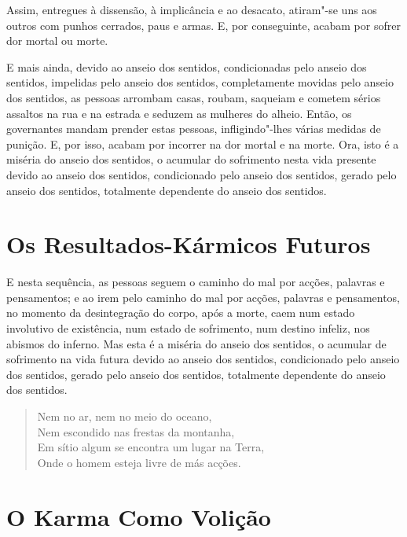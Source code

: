 Assim, entregues à dissensão, à implicância e ao desacato, atiram"-se uns aos
outros com punhos cerrados, paus e armas. E, por conseguinte, acabam por sofrer
dor mortal ou morte.

E mais ainda, devido ao anseio dos sentidos, condicionadas pelo anseio dos
sentidos, impelidas pelo anseio dos sentidos, completamente movidas pelo anseio
dos sentidos, as pessoas arrombam casas, roubam, saqueiam e cometem sérios
assaltos na rua e na estrada e seduzem as mulheres do alheio. Então, os
governantes mandam prender estas pessoas, infligindo"-lhes várias medidas de
punição. E, por isso, acabam por incorrer na dor mortal e na morte. Ora, isto é
a miséria do anseio dos sentidos, o acumular do sofrimento nesta vida presente
devido ao anseio dos sentidos, condicionado pelo anseio dos sentidos, gerado
pelo anseio dos sentidos, totalmente dependente do anseio dos sentidos.


\section{Os Resultados-Kármicos Futuros}

E nesta sequência, as pessoas seguem o caminho do mal por acções, palavras e
pensamentos; e ao irem pelo caminho do mal por acções, palavras e pensamentos,
no momento da desintegração do corpo, após a morte, caem num estado involutivo
de existência, num estado de sofrimento, num destino infeliz, nos abismos do
inferno. Mas esta é a miséria do anseio dos sentidos, o acumular de sofrimento
na vida futura devido ao anseio dos sentidos, condicionado pelo anseio dos
sentidos, gerado pelo anseio dos sentidos, totalmente dependente do anseio dos
sentidos.


\begin{verse}
  Nem no ar, nem no meio do oceano,\\
  Nem escondido nas frestas da montanha,\\
  Em sítio algum se encontra um lugar na Terra,\\
  Onde o homem esteja livre de más acções.

\end{verse}

\section{O Karma Como Volição}

